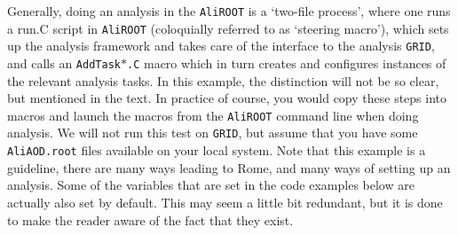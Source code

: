 \documentclass[a4paper]{book}
\numberwithin{equation}{subsection}
\begin{document}
Generally, doing an analysis in the \texttt{AliROOT} is a `two-file process', where one runs a run.C script in \texttt{AliROOT} (coloquially referred to as `steering macro'), which sets up the analysis framework and takes care of the interface to the analysis \texttt{GRID}, and calls an \texttt{AddTask$\ast$.C} macro which in turn creates and configures instances of the relevant analysis tasks. In this example, the distinction will not be so clear, but mentioned in the text. In practice of course, you would copy these steps into macros and launch the macros from the \texttt{AliROOT} command line when doing analysis. We will not run this test on \texttt{GRID}, but assume that you have some \texttt{AliAOD.root} files available on your local system. Note that this example is a guideline, there are many ways leading to Rome, and many ways of setting up an analysis. Some of the variables that are set in the code examples below are actually also set by default. This may seem a little bit redundant, but it is done to make the reader aware of the fact that they exist. 
\end{document}
